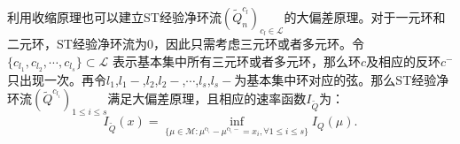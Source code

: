 利用收缩原理也可以建立ST经验净环流$(\tilde{Q}^{c_l}_n)_{c_l\in\mathcal{L}}$的大偏差原理。对于一元环和二元环，ST经验净环流为0，因此只需考虑三元环或者多元环。令$\{c_{l_1}, c_{l_2}, \cdots, c_{l_s}\} \subset \mathcal{L}$ 表示基本集中所有三元环或者多元环，那么环$c$及相应的反环$c^-$只出现一次。再令$l_1$,$l_1-$,$l_2$,$l_2-$,$\cdots$,$l_s$,$l_s-$为基本集中环对应的弦。那么ST经验净环流$(\tilde{Q}^{c_{l_i}})_{1\le i\le s}$满足大偏差原理，且相应的速率函数$I_{\tilde{Q}}$为：
\begin{equation}\label{I_Q2}
	I_{\tilde{Q}}(x)=\inf_{\{\mu\in\mathcal{M}:\mu^{c_{l_{i}}}-\mu^{c_{l_{i}}-}= x_i,\forall 1\le i\le s\}}I_Q(\mu).
\end{equation}